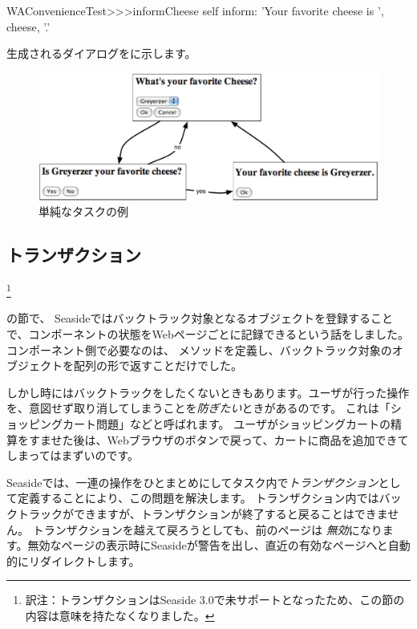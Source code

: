 \documentclass[a4paper,10pt,twoside]{book}
\begin{document}
\begin{code}{}
WAConvenienceTest>>>informCheese
	self inform: 'Your favorite cheese is ', cheese, '.'
\end{code}

生成されるダイアログをに示します。

\begin{figure}[ht]
\begin{center}
\includegraphics[width=\textwidth]{chooseCheese}
\caption{単純なタスクの例}
\end{center}
\end{figure}

\subsection{トランザクション}
\footnote{訳注：トランザクションはSeaside 3.0で未サポートとなったため、この節の内容は意味を持たなくなりました。}

 の節で、 Seasideではバックトラック対象となるオブジェクトを登録することで、コンポーネントの状態をWebページごとに記録できるという話をしました。
コンポーネント側で必要なのは、 メソッドを定義し、バックトラック対象のオブジェクトを配列の形で返すことだけでした。

しかし時にはバックトラックをしたくないときもあります。ユーザが行った操作を、意図せず取り消してしまうことを\emph{防ぎたい}ときがあるのです。
これは「ショッピングカート問題」などと呼ばれます。
ユーザがショッピングカートの精算をすませた後は、Webブラウザのボタンで戻って、カートに商品を追加できてしまってはまずいのです。

Seasideでは、一連の操作をひとまとめにしてタスク内で\emph{トランザクション}として定義することにより、この問題を解決します。
トランザクション内ではバックトラックができますが、トランザクションが終了すると戻ることはできません。
トランザクションを越えて戻ろうとしても、前のページは \emph{無効}になります。無効なページの表示時にSeasideが警告を出し、直近の有効なページへと自動的にリダイレクトします。
\end{document}

